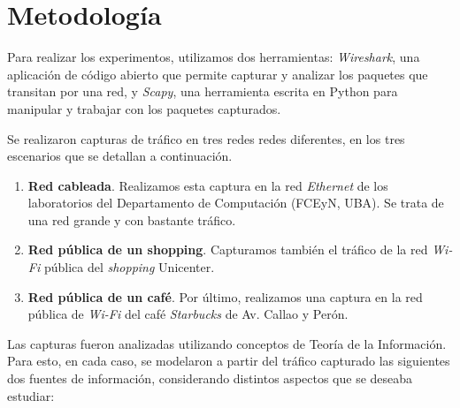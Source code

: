 
\section{Metodología}

Para realizar los experimentos, utilizamos dos herramientas: \emph{Wireshark},
una aplicación de código abierto que permite capturar y analizar los paquetes
que transitan por una red, y \emph{Scapy}, una herramienta escrita en
Python para manipular y trabajar con los paquetes capturados.

Se realizaron capturas de tráfico en tres redes redes diferentes, en los tres
escenarios que se detallan a continuación.

\begin{enumerate}
    \item \textbf{Red cableada}. Realizamos esta captura en la red \emph{Ethernet}
    de los laboratorios del Departamento de Computación (FCEyN, UBA). Se trata
    de una red grande y con bastante tráfico.
    \item \textbf{Red pública de un shopping}. Capturamos también el tráfico
    de la red \emph{Wi-Fi} pública del \emph{shopping} Unicenter.
    \item \textbf{Red pública de un café}. Por último, realizamos una captura
    en la red pública de \emph{Wi-Fi} del café \emph{Starbucks} de Av. Callao y Perón.
\end{enumerate}

Las capturas fueron analizadas utilizando conceptos de Teoría de la
Información. Para esto, en cada caso, se modelaron a partir del tráfico
capturado las siguientes dos fuentes de información, considerando distintos
aspectos que se deseaba estudiar:


